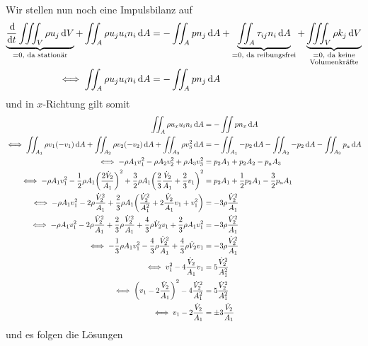 \documentclass{exercise}
\begin{document}
\begin{enumerate}
        Wir stellen nun noch eine Impulsbilanz auf
        \begin{align*}
            \underbrace{\frac{\d}{\d t}\iiint_V \rho u_j\d V}_{= 0\text{, da stationär}} + \iint_A \rho u_j u_i n_i\d A &= -\iint_A pn_j\d A + \underbrace{\iint_A \tau_{ij}n_i\d A}_{= 0\text{, da reibungsfrei}} + \underbrace{\iiint_V \rho k_j\d V}_{\substack{= 0\text{, da keine}\\\text{Volumenkräfte}}}\\
            \iff \iint_A \rho u_j u_i n_i\d A &= -\iint_A pn_j\d A
        \end{align*}
        und in \(x\)-Richtung gilt somit
        \begin{align*}
            \iint_A \rho u_x u_i n_i\d A &= -\iint pn_x\d A\\
            \iff \iint_{A_1}\rho v_1\parentheses*{-v_1}\d A + \iint_{A_2}\rho v_2\parentheses*{-v_2}\d A + \iint_{A_3}\rho v_3^2 \d A &= -\iint_{A_1}-p_2\d A - \iint_{A_2}-p_2\d A - \iint_{A_3}p_a\d A\\
            \iff -\rho A_1 v_1^2 - \rho A_2 v_2^2 + \rho A_3 v_3^2 &= p_2 A_1 + p_2 A_2 - p_a A_3\\
            \iff -\rho A_1 v_1^2 - \frac{1}{2}\rho A_1\parentheses*{\frac{2\dot{V}_2}{A_1}}^2 + \frac{3}{2}\rho A_1\parentheses*{\frac{2}{3}\frac{\dot{V}_2}{A_1} + \frac{2}{3}v_1}^2 &= p_2 A_1 + \frac{1}{2}p_2 A_1 - \frac{3}{2}p_a A_1\\
            \iff -\rho A_1 v_1^2 - 2\rho\frac{\dot{V}_2^2}{A_1} + \frac{2}{3}\rho A_1\parentheses*{\frac{\dot{V}_2^2}{A_1^2} + 2\frac{\dot{V}_2}{A_1}v_1 + v_1^2} &= -3\rho\frac{\dot{V}_2^2}{A_1}\\
            \iff -\rho A_1 v_1^2 - 2\rho\frac{\dot{V}_2^2}{A_1} + \frac{2}{3}\rho\frac{\dot{V}_2^2}{A_1} + \frac{4}{3}\rho\dot{V}_2 v_1 + \frac{2}{3}\rho A_1 v_1^2 &= -3\rho\frac{\dot{V}_2^2}{A_1}\\
            \iff -\frac{1}{3}\rho A_1 v_1^2 - \frac{4}{3}\rho\frac{\dot{V}_2^2}{A_1} + \frac{4}{3}\rho\dot{V}_2 v_1 &= -3\rho\frac{\dot{V}_2^2}{A_1}\\
            \iff v_1^2 - 4\frac{\dot{V}_2}{A_1}v_1 &= 5\frac{\dot{V}_2^2}{A_1^2}\\
            \iff \parentheses*{v_1 - 2\frac{\dot{V}_2}{A_1}}^2 - 4\frac{\dot{V}_2^2}{A_1^2} &= 5\frac{\dot{V}_2^2}{A_1^2}\\
            \iff v_1 - 2\frac{\dot{V}_2}{A_1} &= \pm 3\frac{\dot{V}_2}{A_1}
        \end{align*}
        und es folgen die Lösungen

\end{enumerate}
\end{document}
